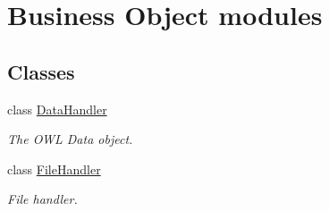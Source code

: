 \hypertarget{group__OWL__BO__LAYER}{
\section{Business Object modules}
\label{group__OWL__BO__LAYER}
}
\subsection*{Classes}
\begin{CompactItemize}
\item 
class \hyperlink{classDataHandler}{DataHandler}
\begin{CompactList}\small\item\em The OWL Data object. \item\end{CompactList}\item 
class \hyperlink{classFileHandler}{FileHandler}
\begin{CompactList}\small\item\em File handler. \item\end{CompactList}\end{CompactItemize}

